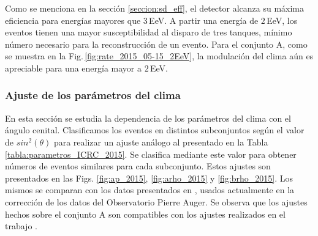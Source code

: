 	Como se menciona en la sección \ref{seccion:sd_eff}, el detector alcanza su máxima eficiencia para energías mayores que 3\,EeV. A partir una energía de $2\,$EeV, los eventos tienen una mayor susceptibilidad al disparo de tres tanques, mínimo número necesario para la reconstrucción de un evento. Para el conjunto A, como se muestra en la Fig.\,\ref{fig:rate_2015_05-15_2EeV}, la modulación del clima aún es apreciable para una energía mayor a $2\,$EeV. 
			\subsubsection{Ajuste de los parámetros del clima}
			En esta sección se estudia la dependencia de los parámetros del clima con el ángulo cenital. Clasificamos los eventos en distintos subconjuntos según el valor de $sin^2(\theta)$ para realizar un ajuste análogo al presentado en la Tabla \ref{tabla:parametros_ICRC_2015}. Se clasifica mediante este valor para obtener números de eventos similares para cada subconjunto. Estos ajustes son presentados en las Figs. \ref{fig:ap_2015}, \ref{fig:arho_2015} y \ref{fig:brho_2015}. Los mismos se comparan con los datos presentados en \cite{aab2017impact}, usados actualmente en la corrección de los datos del Observatorio Pierre Auger. Se observa que los ajustes hechos sobre el conjunto A son compatibles con los ajustes realizados en  el trabajo \cite{aab2017impact}. 
